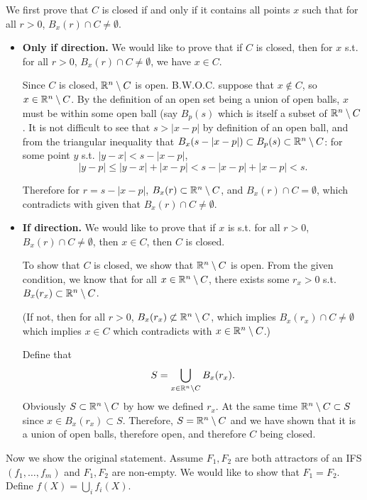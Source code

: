We first prove that \(C\) is closed if and only if it contains all points \(x\) such that for all \(r > 0\), \(B_x(r) \cap C \neq \emptyset\).

\begin{itemize}
    \item \textbf{Only if direction.} We would like to prove that if \(C\) is closed, then for \(x\) s.t. for all \(r > 0\), \(B_x(r) \cap C \neq \emptyset\), we have \(x \in C\).

    Since \(C\) is closed, \(\mathbb{R}^n \setminus C\) is open. B.W.O.C. suppose that \(x \notin C\), so \(x \in \mathbb{R}^n \setminus C\). By the definition of an open set being a union of open balls, \(x\) must be within some open ball (say \(B_p(s)\) which is itself a subset of \(\mathbb{R}^n \setminus C\). It is not difficult to see that \(s > |x - p|\) by definition of an open ball, and from the triangular inequality that \(B_x(s - |x - p|) \subset B_p(s) \subset \mathbb{R}^n \setminus C\): for some point \(y\) s.t. \(|y - x| < s - |x - p|\),
    \[|y - p| \leq |y - x| + |x - p| < s - |x - p| + |x - p| < s.\]

    Therefore for \(r = s - |x - p|\), \(B_x(r) \subset \mathbb{R}^n \setminus C\), and \(B_x(r) \cap C = \emptyset\), which contradicts with given that \(B_x(r) \cap C \neq \emptyset\).

    \item \textbf{If direction.} We would like to prove that if \(x\) is s.t. for all \(r > 0\), \(B_x(r) \cap C \neq \emptyset\), then \(x \in C\), then \(C\) is closed.

    To show that \(C\) is closed, we show that \(\mathbb{R}^n \setminus C\) is open. From the given condition, we know that for all \(x \in \mathbb{R}^n \setminus C\), there exists some \(r_x > 0\) s.t. \(B_x(r_x) \subset \mathbb{R}^n \setminus C\).
    
    (If not, then for all \(r > 0\), \(B_x(r_x) \not\subset \mathbb{R}^n \setminus C\), which implies \(B_x(r_x) \cap C \neq \emptyset\) which implies \(x \in C\) which contradicts with \(x \in \mathbb{R}^n \setminus C\).)
    
    Define that
    \[
        S = \bigcup_{x \in \mathbb{R}^n \setminus C} B_x (r_x).
    \]
    Obviously \(S \subset \mathbb{R}^n \setminus C\) by how we defined \(r_x\). At the same time \(\mathbb{R}^n\setminus C \subset S\) since \(x \in B_x(r_x) \subset S\). Therefore, \(S = \mathbb{R}^n \setminus C\) and we have shown that it is a union of open balls, therefore open, and therefore \(C\) being closed.
\end{itemize}

Now we show the original statement. Assume \(F_1, F_2\) are both attractors of an IFS \((f_1, \ldots, f_m)\) and \(F_1, F_2\) are non-empty. We would like to show that \(F_1 = F_2\). Define \(f(X) = \bigcup_i f_i(X)\).